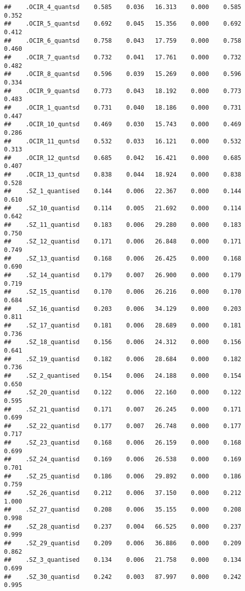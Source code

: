 \documentclass[]{article}
\begin{document}
\begin{verbatim}
##    .OCIR_4_quantsd    0.585    0.036   16.313    0.000    0.585    0.352
##    .OCIR_5_quantsd    0.692    0.045   15.356    0.000    0.692    0.412
##    .OCIR_6_quantsd    0.758    0.043   17.759    0.000    0.758    0.460
##    .OCIR_7_quantsd    0.732    0.041   17.761    0.000    0.732    0.482
##    .OCIR_8_quantsd    0.596    0.039   15.269    0.000    0.596    0.334
##    .OCIR_9_quantsd    0.773    0.043   18.192    0.000    0.773    0.483
##    .OCIR_1_quantsd    0.731    0.040   18.186    0.000    0.731    0.447
##    .OCIR_10_quntsd    0.469    0.030   15.743    0.000    0.469    0.286
##    .OCIR_11_quntsd    0.532    0.033   16.121    0.000    0.532    0.313
##    .OCIR_12_quntsd    0.685    0.042   16.421    0.000    0.685    0.407
##    .OCIR_13_quntsd    0.838    0.044   18.924    0.000    0.838    0.528
##    .SZ_1_quantised    0.144    0.006   22.367    0.000    0.144    0.610
##    .SZ_10_quantisd    0.114    0.005   21.692    0.000    0.114    0.642
##    .SZ_11_quantisd    0.183    0.006   29.280    0.000    0.183    0.750
##    .SZ_12_quantisd    0.171    0.006   26.848    0.000    0.171    0.749
##    .SZ_13_quantisd    0.168    0.006   26.425    0.000    0.168    0.690
##    .SZ_14_quantisd    0.179    0.007   26.900    0.000    0.179    0.719
##    .SZ_15_quantisd    0.170    0.006   26.216    0.000    0.170    0.684
##    .SZ_16_quantisd    0.203    0.006   34.129    0.000    0.203    0.811
##    .SZ_17_quantisd    0.181    0.006   28.689    0.000    0.181    0.736
##    .SZ_18_quantisd    0.156    0.006   24.312    0.000    0.156    0.641
##    .SZ_19_quantisd    0.182    0.006   28.684    0.000    0.182    0.736
##    .SZ_2_quantised    0.154    0.006   24.188    0.000    0.154    0.650
##    .SZ_20_quantisd    0.122    0.006   22.160    0.000    0.122    0.595
##    .SZ_21_quantisd    0.171    0.007   26.245    0.000    0.171    0.699
##    .SZ_22_quantisd    0.177    0.007   26.748    0.000    0.177    0.717
##    .SZ_23_quantisd    0.168    0.006   26.159    0.000    0.168    0.699
##    .SZ_24_quantisd    0.169    0.006   26.538    0.000    0.169    0.701
##    .SZ_25_quantisd    0.186    0.006   29.892    0.000    0.186    0.759
##    .SZ_26_quantisd    0.212    0.006   37.150    0.000    0.212    1.000
##    .SZ_27_quantisd    0.208    0.006   35.155    0.000    0.208    0.998
##    .SZ_28_quantisd    0.237    0.004   66.525    0.000    0.237    0.999
##    .SZ_29_quantisd    0.209    0.006   36.886    0.000    0.209    0.862
##    .SZ_3_quantised    0.134    0.006   21.758    0.000    0.134    0.699
##    .SZ_30_quantisd    0.242    0.003   87.997    0.000    0.242    0.995

\end{verbatim}
\end{document}
